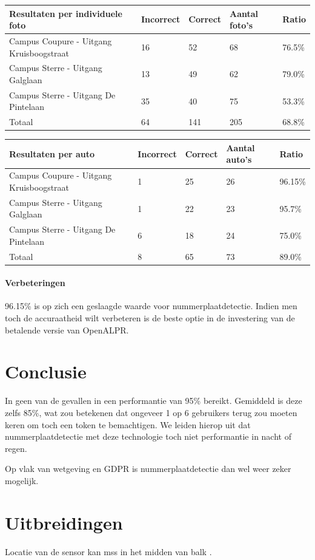 \begin{table}[h!]
	\centering
	\begin{tabular}{l|l|l|l|l}
		\textbf{Resultaten per individuele foto}	& \textbf{Incorrect}	& \textbf{Correct} & \textbf{Aantal foto's} & \textbf{Ratio} \\ \hline
		Campus Coupure - Uitgang Kruisboogstraat & 16 & 52 & 68 & 76.5\% \\
		Campus Sterre - Uitgang Galglaan 		 & 13 & 49 & 62 & 79.0\%\\
		Campus Sterre - Uitgang De Pintelaan	 & 35 & 40 & 75 & 53.3\%\\ \hline
		Totaal 									 & 64 & 141 & 205 & 68.8\%
	\end{tabular}
\end{table}

\begin{table}[h!]
	\centering
	\begin{tabular}{l|l|l|l|l}
		\textbf{Resultaten per auto} & \textbf{Incorrect}	& \textbf{Correct} & \textbf{Aantal auto's} & \textbf{Ratio} \\ \hline
		Campus Coupure - Uitgang Kruisboogstraat& 1 & 25  & 26 & 96.15\% \\
		Campus Sterre - Uitgang Galglaan		& 1 & 22  & 23 & 95.7\%\\
		Campus Sterre - Uitgang De Pintelaan	& 6 & 18  & 24 & 75.0\%\\ \hline
		Totaal 									& 8 & 65 & 73 & 89.0\%
	\end{tabular}
\end{table}


\paragraph{Verbeteringen}
96.15\% is op zich een geslaagde waarde voor nummerplaatdetectie. Indien men toch de accuraatheid wilt verbeteren is de beste optie in de investering van de betalende versie van OpenALPR.

\section{Conclusie}
In geen van de gevallen in een performantie van 95\% bereikt. Gemiddeld is deze zelfs 85\%, wat zou betekenen dat ongeveer 1 op 6 gebruikers terug zou moeten keren om toch een token te bemachtigen. We leiden hierop uit dat nummerplaatdetectie met deze technologie toch niet 
performantie in nacht of regen.

Op vlak van wetgeving en GDPR is nummerplaatdetectie dan wel weer zeker mogelijk.

\section{Uitbreidingen}
Locatie van de sensor kan mss in het midden van balk \autocite{buhus2016automatic}.